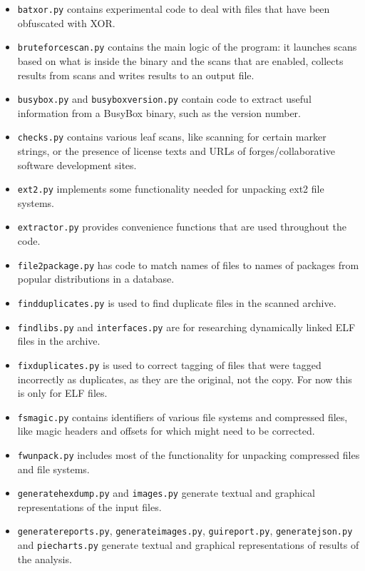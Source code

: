 \documentclass[10pt,a4paper]{article}
\begin{document}
\begin{itemize}
\item \texttt{batxor.py} contains experimental code to deal with files that
have been obfuscated with XOR.
\item \texttt{bruteforcescan.py} contains the main logic of the program: it
launches scans based on what is inside the binary and the scans that are
enabled, collects results from scans and writes results to an output file.
\item \texttt{busybox.py} and \texttt{busyboxversion.py} contain code to
extract useful information from a BusyBox binary, such as the version number.
\item \texttt{checks.py} contains various leaf scans, like scanning for certain
marker strings, or the presence of license texts and URLs of
forges/collaborative software development sites.
\item \texttt{ext2.py} implements some functionality needed for unpacking ext2
file systems.
\item \texttt{extractor.py} provides convenience functions that are used
throughout the code.
\item \texttt{file2package.py} has code to match names of files to names of
packages from popular distributions in a database.
\item \texttt{findduplicates.py} is used to find duplicate files in the scanned
archive.
\item \texttt{findlibs.py} and \texttt{interfaces.py} are for researching
dynamically linked ELF files in the archive.
\item \texttt{fixduplicates.py} is used to correct tagging of files that were
tagged incorrectly as duplicates, as they are the original, not the copy. For
now this is only for ELF files.
\item \texttt{fsmagic.py} contains identifiers of various file systems and
compressed files, like magic headers and offsets for which might need to be
corrected.
\item \texttt{fwunpack.py} includes most of the functionality for unpacking
compressed files and file systems.
\item \texttt{generatehexdump.py} and \texttt{images.py} generate textual and
graphical representations of the input files.
\item \texttt{generatereports.py}, \texttt{generateimages.py},
\texttt{guireport.py}, \texttt{generatejson.py} and \texttt{piecharts.py}
generate textual and graphical representations of results of the analysis.

\end{itemize}
\end{document}
